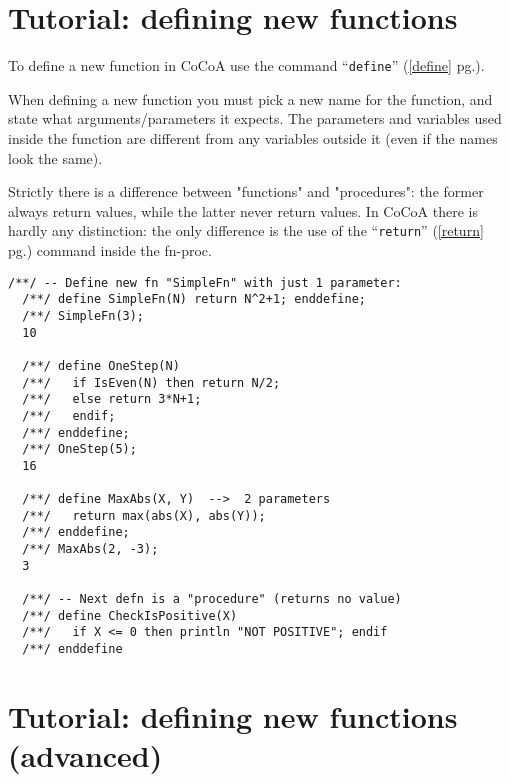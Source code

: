 \documentclass[a4paper]{mybook}
\begin{document}
\section{Tutorial: defining new functions}
\label{Tutorial: defining new functions}

        
To define a new function in CoCoA use the command ``\verb&define&'' (\ref{define} pg.\pageref{define}).
\par 
When defining a new function you must pick a new name for the function,
and state what arguments/parameters it expects.  The parameters and
variables used inside the function are different from any variables
outside it (even if the names look the same).
\par 
Strictly there is a difference between "functions" and "procedures":
the former always return values, while the latter never return values.
In CoCoA there is hardly any distinction: the only difference is the
use of the ``\verb&return&'' (\ref{return} pg.\pageref{return}) command inside the fn-proc.

\begin{Verbatim}[label=example, rulecolor=\color{PineGreen}, frame=single]
  /**/ -- Define new fn "SimpleFn" with just 1 parameter:
  /**/ define SimpleFn(N) return N^2+1; enddefine;
  /**/ SimpleFn(3);
  10

  /**/ define OneStep(N)
  /**/   if IsEven(N) then return N/2;
  /**/   else return 3*N+1;
  /**/   endif;
  /**/ enddefine;
  /**/ OneStep(5);
  16

  /**/ define MaxAbs(X, Y)  -->  2 parameters
  /**/   return max(abs(X), abs(Y));
  /**/ enddefine;
  /**/ MaxAbs(2, -3);
  3

  /**/ -- Next defn is a "procedure" (returns no value)
  /**/ define CheckIsPositive(X)
  /**/   if X <= 0 then println "NOT POSITIVE"; endif
  /**/ enddefine
\end{Verbatim}



\section{Tutorial: defining new functions (advanced)}
\label{Tutorial: defining new functions (advanced)}
\end{document}
